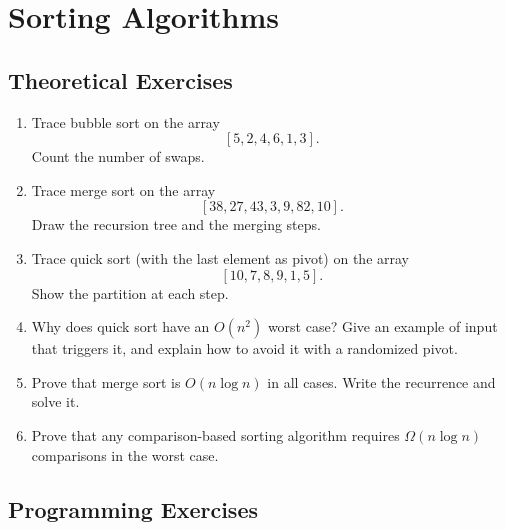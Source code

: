 \documentclass[11pt,a4paper]{article}
\newcommand{\easy}{$\star$}
\newcommand{\medium}{$\star\star$}
\newcommand{\hard}{$\star\star\star$}
\begin{document}
\section{Sorting Algorithms}

\subsection{Theoretical Exercises}

\begin{enumerate}[label=\textbf{4.\arabic*}]

    \item[\easy] Trace bubble sort on the array
    \[
    [5, 2, 4, 6, 1, 3].
    \]
    Count the number of swaps.

    \item[\easy] Trace merge sort on the array
    \[
    [38, 27, 43, 3, 9, 82, 10].
    \]
    Draw the recursion tree and the merging steps.

    \item[\easy] Trace quick sort (with the last element as pivot) on the array
    \[
    [10, 7, 8, 9, 1, 5].
    \]
    Show the partition at each step.

    \item[\medium] Why does quick sort have an $O(n^2)$ worst case? Give an example of input that triggers it, and explain how to avoid it with a randomized pivot.

    \item[\medium] Prove that merge sort is $O(n \log n)$ in all cases. Write the recurrence and solve it.

    \item[\hard] Prove that any comparison-based sorting algorithm requires $\Omega(n \log n)$ comparisons in the worst case.

\end{enumerate}

\subsection{Programming Exercises}
\end{document}
